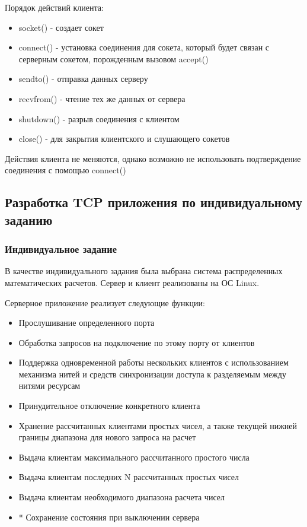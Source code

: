 Порядок действий клиента:
\begin{itemize}
\item socket() - создает сокет
\item connect() - установка соединения для сокета, который будет связан с серверным сокетом, порожденным вызовом accept()
\item sendto() - отправка данных серверу
\item recvfrom() - чтение тех же данных от сервера
\item shutdown() - разрыв соединения с клиентом
\item close() - для закрытия клиентского и слушающего сокетов
\end{itemize}
Действия клиента не меняются, однако возможно не использовать подтверждение соединения с помощью connect()

\subsection{Разработка TCP приложения по индивидуальному заданию}
\subsubsection{Индивидуальное задание}
В качестве индивидуального задания была выбрана система распределенных математических расчетов. Сервер и клиент реализованы на ОС Linux.

Серверное приложение реализует следующие функции:
\begin{itemize}
	\item Прослушивание определенного порта
	\item Обработка запросов на подключение по этому порту от клиентов
	\item Поддержка одновременной работы нескольких клиентов с использованием механизма нитей и средств синхронизации доступа к разделяемым между нитями ресурсам
	\item Принудительное отключение конкретного клиента
	\item Хранение рассчитанных клиентами простых чисел, а также текущей
	нижней границы диапазона для нового запроса на расчет
	\item Выдача клиентам максимального рассчитанного простого числа
	\item Выдача клиентам последних N рассчитанных простых чисел
	\item Выдача клиентам необходимого диапазона расчета чисел
	\item * Сохранение состояния при выключении сервера
\end{itemize}

